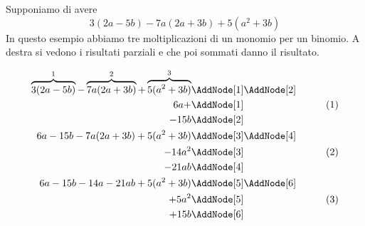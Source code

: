 \begin{esempio}
Supponiamo di avere \[3(2a-5b)-7a(2a+3b)+5(a^2+3b)\]
In questo esempio abbiamo tre moltiplicazioni di un monomio per un binomio. A destra si vedono i risultati parziali e che poi sommati danno il risultato.
\begin{NodesList}
	\begin{align*}
		\overbrace{3(2a-5b)}^{1}-\overbrace{7a(2a+3b)}^{2}+\overbrace{5(a^2+3b)}^{3}&\AddNode[1]\AddNode[2]\\
		6a+&\AddNode[1]&\tag{1}\\ 
		-15b&\AddNode[2]&\\
		6a-15b-7a(2a+3b)+5(a^2+3b)&\AddNode[3]\AddNode[4]\\
		-14a^2&\AddNode[3]&\tag{2}\\    
		-21ab&\AddNode[4]&\\
		6a-15b-14a-21ab+5(a^2+3b)&\nonumber\AddNode[5]\AddNode[6]\\
		+5a^2&\AddNode[5]&\tag{3}\\
		+15b&\AddNode[6]&\\

\end{align*}
\end{NodesList}
\end{esempio}
